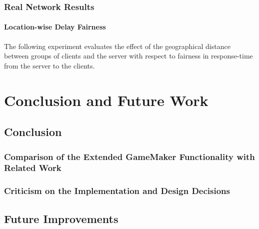 \documentclass[bsc,frontabs,twoside,singlespacing,parskip,deptreport]{infthesis}     %
\begin{document}
\subsection{Real Network Results}
\subsubsection{Location-wise Delay Fairness}
The following experiment evaluates the effect of the geographical distance between groups of clients and the server with respect to fairness in response-time from the server to the clients.





\chapter{Conclusion and Future Work}
\section{Conclusion}
\subsection{Comparison of the Extended GameMaker Functionality with Related Work}
\subsection{Criticism on the Implementation and Design Decisions}

\section{Future Improvements}








\end{document}
